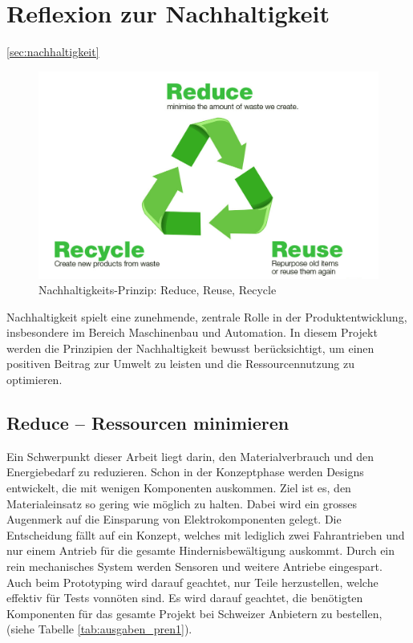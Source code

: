 \documentclass[../main.tex]{subfiles}
\begin{document}
\newpage
\section{Reflexion zur Nachhaltigkeit} \ref{sec:nachhaltigkeit}

\begin{figure}[H] %
    \centering
        \includegraphics[width=0.7\linewidth]{img/nachhaltigkeit/3R-reduce-reuse-recycle.jpg}
        \caption[Nachhaltigkeits-Prinzip: Reduce, Reuse, Recycle]{Nachhaltigkeits-Prinzip: Reduce, Reuse, Recycle \footnotemark}
        
        \label{fig:3R}
    \end{figure} 


Nachhaltigkeit spielt eine zunehmende, zentrale Rolle in der Produktentwicklung, insbesondere im Bereich Maschinenbau und Automation. In diesem Projekt werden die Prinzipien der Nachhaltigkeit bewusst berücksichtigt, um einen positiven Beitrag zur Umwelt zu leisten und die Ressourcennutzung zu optimieren.

\subsection{Reduce – Ressourcen minimieren}

Ein Schwerpunkt dieser Arbeit liegt darin, den Materialverbrauch und den Energiebedarf zu reduzieren. Schon in der Konzeptphase werden Designs entwickelt, die mit wenigen Komponenten auskommen. Ziel ist es, den Materialeinsatz so gering wie möglich zu halten. Dabei wird ein grosses Augenmerk auf die Einsparung von Elektrokomponenten gelegt. Die Entscheidung fällt auf ein Konzept, welches mit lediglich zwei Fahrantrieben und nur einem Antrieb für die gesamte Hindernisbewältigung auskommt. Durch ein rein mechanisches System werden Sensoren und weitere Antriebe eingespart. Auch beim Prototyping wird darauf geachtet, nur Teile herzustellen, welche effektiv für Tests vonnöten sind. Es wird darauf geachtet, die benötigten Komponenten für das gesamte Projekt bei Schweizer Anbietern zu bestellen, (siehe Tabelle \ref{tab:ausgaben_pren1}).
\end{document}
